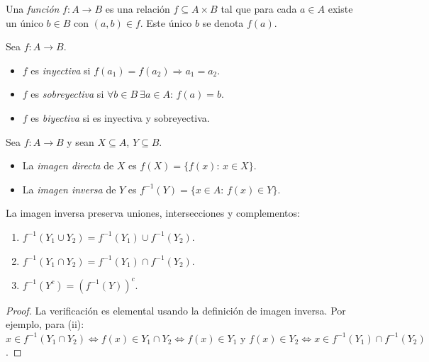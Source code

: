 \begin{definition}
\label{def:funcion}
Una \emph{función} $f\colon A\to B$ es una relación $f\subseteq A\times B$ tal que para cada $a\in A$ existe un único $b\in B$ con $(a,b)\in f$. Este único $b$ se denota $f(a)$.
\end{definition}

\begin{definition}
\label{def:inyectiva-sobreyectiva}
Sea $f\colon A\to B$.
\begin{itemize}
  \item $f$ es \emph{inyectiva} si $f(a_1)=f(a_2)\Rightarrow a_1=a_2$.
  \item $f$ es \emph{sobreyectiva} si $\forall b\in B\ \exists a\in A:\,f(a)=b$.
  \item $f$ es \emph{biyectiva} si es inyectiva y sobreyectiva.
\end{itemize}
\end{definition}

\begin{definition}
\label{def:imagen-preimagen}
Sea $f\colon A\to B$ y sean $X\subseteq A$, $Y\subseteq B$.
\begin{itemize}
  \item La \emph{imagen directa} de $X$ es $f(X)=\{f(x):\,x\in X\}$.
  \item La \emph{imagen inversa} de $Y$ es $f^{-1}(Y)=\{x\in A:\,f(x)\in Y\}$.
\end{itemize}
\end{definition}

\begin{proposition}
\label{prop:imagen-inversa}
La imagen inversa preserva uniones, intersecciones y complementos:
\begin{enumerate}
  \item[(i)] $f^{-1}(Y_1\cup Y_2)=f^{-1}(Y_1)\cup f^{-1}(Y_2)$.
  \item[(ii)] $f^{-1}(Y_1\cap Y_2)=f^{-1}(Y_1)\cap f^{-1}(Y_2)$.
  \item[(iii)] $f^{-1}(Y^c)=(f^{-1}(Y))^c$.
\end{enumerate}
\end{proposition}

\begin{proof}
La verificación es elemental usando la definición de imagen inversa. Por ejemplo, para (ii): $x\in f^{-1}(Y_1\cap Y_2)\Leftrightarrow f(x)\in Y_1\cap Y_2\Leftrightarrow f(x)\in Y_1\text{ y }f(x)\in Y_2\Leftrightarrow x\in f^{-1}(Y_1)\cap f^{-1}(Y_2)$.
\end{proof}

